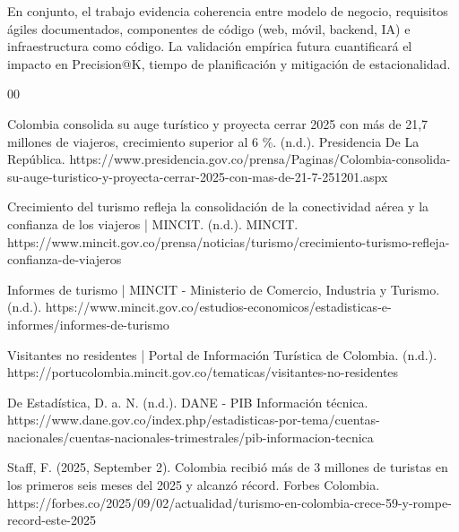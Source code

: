 \documentclass[12pt, letterpaper]{article}
\begin{document}
En conjunto, el trabajo evidencia coherencia entre modelo de negocio, requisitos ágiles documentados, componentes de código (web, móvil, backend, IA) e infraestructura como código. La validación empírica futura cuantificará el impacto en Precision@K, tiempo de planificación y mitigación de estacionalidad.

\newpage

\renewcommand{\refname}{Referencias}
\begin{thebibliography}{00}

Colombia consolida su auge turístico y proyecta cerrar 2025 con más de 21,7 millones de viajeros, crecimiento superior al 6 \%. (n.d.). Presidencia De La República. https://www.presidencia.gov.co/prensa/Paginas/Colombia-consolida-su-auge-turistico-y-proyecta-cerrar-2025-con-mas-de-21-7-251201.aspx

Crecimiento del turismo refleja la consolidación de la conectividad aérea y la confianza de los viajeros | MINCIT. (n.d.). MINCIT. https://www.mincit.gov.co/prensa/noticias/turismo/crecimiento-turismo-refleja-confianza-de-viajeros

Informes de turismo | MINCIT - Ministerio de Comercio, Industria y Turismo. (n.d.). https://www.mincit.gov.co/estudios-economicos/estadisticas-e-informes/informes-de-turismo

Visitantes no residentes | Portal de Información Turística de Colombia. (n.d.). https://portucolombia.mincit.gov.co/tematicas/visitantes-no-residentes

De Estadística, D. a. N. (n.d.). DANE - PIB Información técnica. https://www.dane.gov.co/index.php/estadisticas-por-tema/cuentas-nacionales/cuentas-nacionales-trimestrales/pib-informacion-tecnica

Staff, F. (2025, September 2). Colombia recibió más de 3 millones de turistas en los primeros seis meses del 2025 y alcanzó récord. Forbes Colombia. https://forbes.co/2025/09/02/actualidad/turismo-en-colombia-crece-59-y-rompe-record-este-2025


\end{thebibliography}
\end{document}

